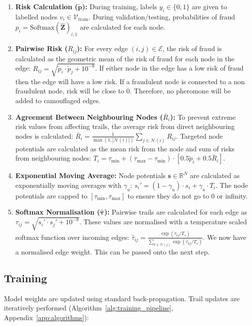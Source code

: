 \begin{enumerate}
    \item \textbf{Risk Calculation ($\tilde{\mathbf{p}}$):}
    During training, labels $y_i \in \{0, 1\}$ are given to labelled nodes $v_i \in \mathcal{V}_{\text{train}}$. During validation/testing, probabilities of fraud $p_i = \text{Softmax}(\hat{\mathbf{Z}})_{i, 1}$ are calculated for each node.

    \item \textbf{Pairwise Risk ($R_{ij}$):}
    For every edge $(i, j) \in \mathcal{E}$, the risk of fraud is calculated as the geometric mean of the risk of fraud for each node in the edge: $R_{ij} = \sqrt{\tilde{p}_i \cdot \tilde{p}_j + 10^{-8}}$. If either node in the edge has a low risk of fraud then the edge will have a low risk. If a fraudulent node is connected to a non fraudulent node, risk will be close to 0. Therefore, no pheromone will be added to camouflaged edges.

    \item \textbf{Agreement Between Neighbouring Nodes ($\bar{R}_i$):}
    To prevent extreme risk values from affecting trails, the average risk from direct neighbouring nodes is calculated: $\bar{R}_i = \frac{1}{\max(1, |\mathcal{N}(i)|)} \sum_{j \in \mathcal{N}(i)} R_{ij}$. Targeted node potentials are calculated as the mean risk from the node and sum of risks from neighbouring nodes: $T_i = \tau_{\min} + (\tau_{\max} - \tau_{\min}) \cdot [0.5 \tilde{p}_i + 0.5 \bar{R}_i]$.

    \item \textbf{Exponential Moving Average:}
    Node potentials $\mathbf{s} \in \mathbb{R}^N$ are calculated as exponentially moving averages with $\gamma_u$: $s_i' = (1 - \gamma_u) \cdot s_i + \gamma_u \cdot T_i$. The node potentials are capped to $[\tau_{\min}, \tau_{\max}]$ to ensure they do not go to 0 or infinity.

    \item \textbf{Softmax Normalisation ($\hat{\boldsymbol{\tau}}$):}
    Pairwise trails are calculated for each edge as $\tau_{ij} = \sqrt{s_i' \cdot s_j' + 10^{-8}}$. These values are normalised with a temperature scaled softmax function over incoming edges: $\hat{\tau}_{ij} = \frac{\exp(\tau_{ij} / T_s)}{\sum_{k \in \mathcal{N}(j)} \exp(\tau_{kj} / T_s)}$. We now have a normalised edge weight. This can be passed onto the next step.
\end{enumerate}

\subsection{Training}
Model weights are updated using standard back-propagation. Trail updates are iteratively performed (Algorithm~\ref{alg:training_pipeline}, Appendix~\ref{app:algorithms}):

